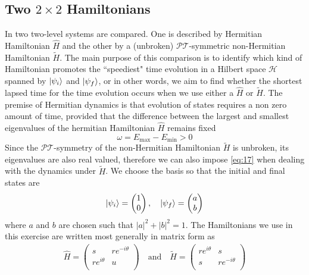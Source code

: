 \documentclass[12pt, a4paper]{report}
\newcommand\PT{\(\mathcal{PT}\)}
\begin{document}
\subsection{Two $2\times2$ Hamiltonians}
In \cite{Bender_2007} two two-level systems are compared. One is described by Hermitian Hamiltonian $\hat{H}$ and the other by a (unbroken) \PT-symmetric non-Hermitian Hamiltonian $\tilde{H}$.  The main purpose of this comparison is to identify which kind of Hamiltonian promotes the ``speediest" time evolution in a Hilbert space $\mathcal{H}$ spanned by $\ket{\psi_{i}}$ and $\ket{\psi_{f}}$, or in other words, we aim to find whether the shortest lapsed time for the time evolution occurs when we use either a $\hat{H}$ or $\tilde{H}$. The premise of Hermitian dynamics is that evolution of states requires a non zero amount of time, provided that the difference between the largest and smallest eigenvalues of the hermitian Hamiltonian $\hat{H}$ remains fixed\cite{Bender_2007}
\begin{equation}\label{eq:17}
\omega = E_{\mathrm{max}} - E_{\mathrm{min}} > 0
\end{equation}
Since the \PT-symmetry of the non-Hermitian Hamiltonian $\tilde{H}$ is unbroken, its eigenvalues are also real valued, therefore we can also  impose \ref{eq:17} when dealing with the dynamics under $\tilde{H}$.
We choose the basis so that the initial and final states are
\begin{align}\label{eq:18}
\ket{\psi_{i}} = \begin{pmatrix}
1\\
0\\
\end{pmatrix}, \quad\ket{\psi_f} = \begin{pmatrix}
a\\
b\\
\end{pmatrix}
\end{align}
where $a$ and $b$ are chosen such that $|a|^2 + |b|^2 = 1$\cite{Bender_2007}.
The Hamiltonians we use in this exercise are written most generally in matrix form as
\begin{align}\label{eq:19}
\hat{H} = \begin{pmatrix}
s & re^{-i\theta}\\
re^{i\theta} & u \\
\end{pmatrix}\quad\mathrm{and}\quad\tilde{H} = \begin{pmatrix}
re^{i\theta} & s  \\
s & re^{-i\theta} \\
\end{pmatrix}
\end{align} 
\end{document}
